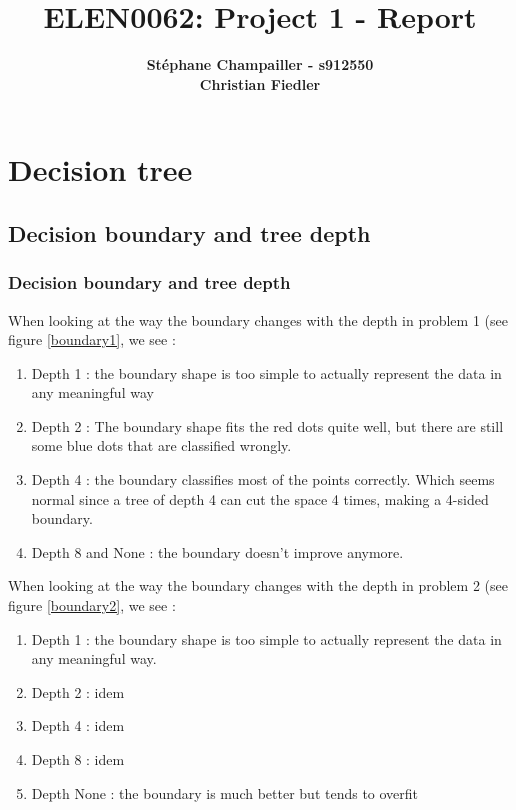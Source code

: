\documentclass{article}
\begin{document}

\title{\Large{ELEN0062: Project 1 - Report}}
\vspace{1cm}
\author{\small{\bf Stéphane Champailler - s912550 } \\ \small{\bf Christian Fiedler}}



\maketitle


\def\picwidth{7cm}

\section{Decision tree}
\subsection{Decision boundary and tree depth}
\subsubsection{Decision boundary and tree depth}

When looking at the way the boundary changes with the depth in problem 1 (see figure \ref{boundary1}, we see :
\begin{enumerate}
\item Depth 1 : the boundary shape is too simple to actually represent the data in any meaningful way
\item Depth 2 : The boundary shape fits the red dots quite well, but there are still some blue dots that are classified wrongly.
\item Depth 4 : the boundary classifies most of the points correctly. Which seems normal since a tree of depth 4 can cut the space 4 times, making a 4-sided boundary.
\item Depth 8 and None : the boundary doesn't improve anymore.
\end{enumerate}


When looking at the way the boundary changes with the depth in problem 2 (see figure \ref{boundary2}, we see :
\begin{enumerate}
\item Depth 1 : the boundary shape is too simple to actually represent the data in any meaningful way.
\item Depth 2 : idem
\item Depth 4 : idem
\item Depth 8 : idem
\item Depth None : the boundary is much better but tends to overfit
\end{enumerate}
\end{document}
